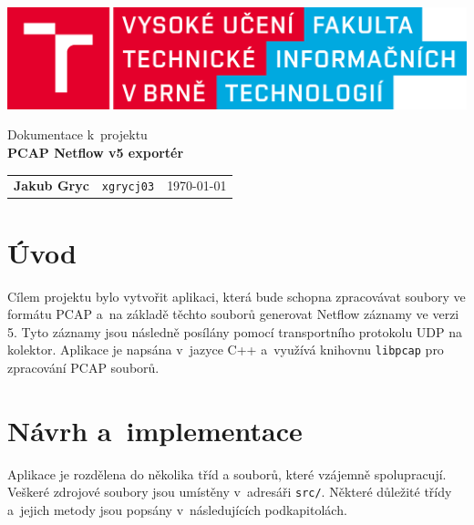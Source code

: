\documentclass[a4paper, 11pt]{article}
\begin{document}
\begin{sloppypar}
\begin{titlepage}
		\begin{center}
			\includegraphics[width=0.85\linewidth]{./logo_cz.png} \\


			\Huge{Dokumentace k~projektu} \\
			\LARGE{\textbf{PCAP Netflow v5 exportér}} \\
		\end{center}

			\Large

   
            \begin{tabularx}{0.96\textwidth}{ll>{\raggedleft\arraybackslash}X}
                \textbf{Jakub Gryc} & \texttt{xgrycj03} &  \Large\today \\ 
			\end{tabularx}


	\end{titlepage}

\tableofcontents

\newpage
\section{Úvod}

Cílem projektu bylo vytvořit aplikaci, která bude schopna zpracovávat soubory ve formátu PCAP a~na základě těchto souborů generovat Netflow záznamy ve verzi 5. Tyto záznamy jsou následně posílány pomocí transportního protokolu UDP na kolektor. Aplikace je napsána v~jazyce C++ a~využívá knihovnu \texttt{libpcap} pro zpracování PCAP souborů.
\section{Návrh a~implementace}

Aplikace je rozdělena do několika tříd a souborů, které vzájemně spolupracují. Veškeré zdrojové soubory jsou umístěny v~adresáři \texttt{src/}. Některé důležité třídy a~jejich metody jsou popsány v~následujících podkapitolách.

\end{sloppypar}
\end{document}
